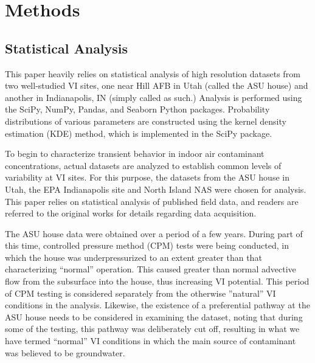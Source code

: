 \documentclass[journal=esthag,manuscript=article]{achemso}
\begin{document}
\section{Methods}

\subsection{Statistical Analysis}

This paper heavily relies on statistical analysis of high resolution datasets from two well-studied VI sites, one near Hill AFB in Utah (called the ASU house) and another in Indianapolis, IN (simply called as such.)
Analysis is performed using the SciPy, NumPy, Pandas, and Seaborn Python packages.
Probability distributions of various parameters are constructed using the kernel density estimation (KDE) method\cite{altman_introduction_1992}, which is implemented in the SciPy package.

To begin to characterize transient behavior in indoor air contaminant concentrations, actual datasets are analyzed to establish common levels of variability at VI sites.
For this purpose, the datasets from the ASU house in Utah, the EPA Indianapolis site and North Island NAS were chosen for analysis.
This paper relies on statistical analysis of published field data, and readers are referred to the original works for details regarding data acquisition\cite{holton_evaluation_2015,guo_vapor_2015,holton_temporal_2013,hosangadi_high-frequency_2017,u.s._environmental_protection_agency_assessment_2015}. \par

The ASU house data were obtained over a period of a few years.
During part of this time, controlled pressure method (CPM) tests were being conducted, in which the house was underpressurized to an extent greater than that characterizing “normal” operation.
This caused greater than normal advective flow from the subsurface into the house, thus increasing VI potential\cite{mchugh_evaluation_2012,mchugh_recent_2017,holton_evaluation_2015}.
This period of CPM testing is considered separately from the otherwise ”natural” VI conditions in the analysis.
Likewise, the existence of a preferential pathway at the ASU house needs to be considered in examining the dataset, noting that during some of the testing, this pathway was deliberately cut off, resulting in what we have termed “normal” VI conditions in which the main source of contaminant was believed to be groundwater. \par
\end{document}
